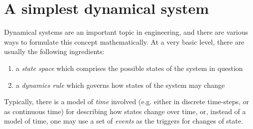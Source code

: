 
\section{A simplest dynamical system}
\label{sec:simplest-dyn-system}


Dynamical systems are an important topic in engineering, and there are various ways to formulate this concept mathematically.
At a very basic level, there are usually the following ingredients:
\begin{enumerate}
    \item a \emph{state space} which comprises the possible states of the system in question
    \item a \emph{dynamics rule} which governs how states of the system may change
\end{enumerate}
Typically, there is a model of \emph{time} involved (e.g. either in discrete time-steps, or as continuous time) for describing how states change over time, or, instead of a model of time, one may use a set of \emph{events} as the triggers for changes of state.

